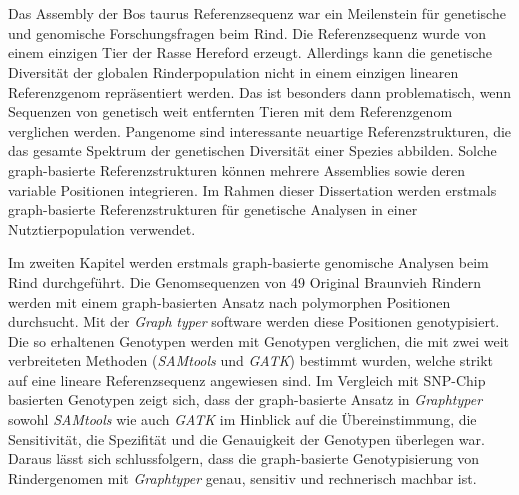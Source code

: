 \documentclass[11 pt, a4paper, notitlepage, twoside]{report}
\begin{document}
\newpage

\thispagestyle{plain}
{}
\section*{}

Das Assembly der Bos taurus Referenzsequenz war ein Meilenstein für genetische und genomische Forschungsfragen beim Rind. Die Referenzsequenz wurde von einem einzigen Tier der Rasse Hereford erzeugt. Allerdings kann die genetische Diversität der globalen Rinderpopulation nicht in einem einzigen linearen Referenzgenom repräsentiert werden. Das ist besonders dann problematisch, wenn Sequenzen von genetisch weit entfernten Tieren mit dem Referenzgenom verglichen werden. Pangenome sind interessante neuartige Referenzstrukturen, die das gesamte Spektrum der genetischen Diversität einer Spezies abbilden. Solche graph-basierte Referenzstrukturen können mehrere Assemblies sowie deren variable Positionen integrieren. Im Rahmen dieser Dissertation werden erstmals graph-basierte Referenzstrukturen für genetische Analysen in einer Nutztierpopulation verwendet.

Im zweiten Kapitel werden erstmals graph-basierte genomische Analysen beim Rind durchgeführt. Die Genomsequenzen von 49 Original Braunvieh Rindern werden mit einem graph-basierten Ansatz nach polymorphen Positionen durchsucht. Mit der \emph{Graph} \emph{typer} software werden diese Positionen genotypisiert. Die so erhaltenen Genotypen werden mit Genotypen verglichen, die mit zwei weit verbreiteten Methoden (\emph{SAMtools} und \emph{GATK}) bestimmt wurden, welche strikt auf eine lineare Referenzsequenz angewiesen sind. Im Vergleich mit SNP-Chip basierten Genotypen zeigt sich, dass der graph-basierte Ansatz in \emph{Graphtyper} sowohl \emph{SAMtools} wie auch \emph{GATK} im Hinblick auf die Übereinstimmung, die Sensitivität, die Spezifität und die Genauigkeit der Genotypen überlegen war. Daraus lässt sich schlussfolgern, dass die graph-basierte Genotypisierung von Rindergenomen mit \emph{Graphtyper} genau, sensitiv und rechnerisch machbar ist.
\end{document}
